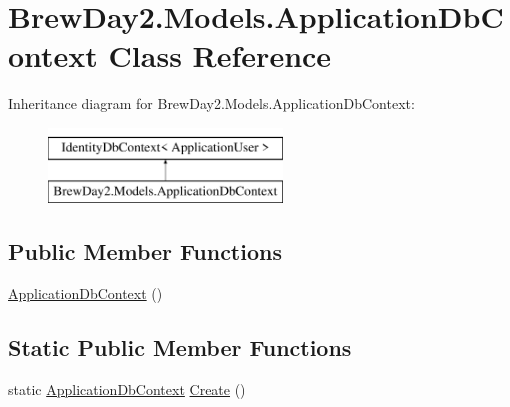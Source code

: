 \hypertarget{class_brew_day2_1_1_models_1_1_application_db_context}{}\section{Brew\+Day2.\+Models.\+Application\+Db\+Context Class Reference}
\label{class_brew_day2_1_1_models_1_1_application_db_context}
Inheritance diagram for Brew\+Day2.\+Models.\+Application\+Db\+Context\+:\begin{figure}[H]
\begin{center}
\leavevmode
\includegraphics[height=2.000000cm]{class_brew_day2_1_1_models_1_1_application_db_context}
\end{center}
\end{figure}
\subsection*{Public Member Functions}
\begin{DoxyCompactItemize}
\item 
\mbox{\hyperlink{class_brew_day2_1_1_models_1_1_application_db_context_a0a3608913cebe6dde245797434dee7d7}{Application\+Db\+Context}} ()
\end{DoxyCompactItemize}
\subsection*{Static Public Member Functions}
\begin{DoxyCompactItemize}
\item 
static \mbox{\hyperlink{class_brew_day2_1_1_models_1_1_application_db_context}{Application\+Db\+Context}} \mbox{\hyperlink{class_brew_day2_1_1_models_1_1_application_db_context_a38a3a3e7dcf57f43e88f513440a9c687}{Create}} ()
\end{DoxyCompactItemize}
